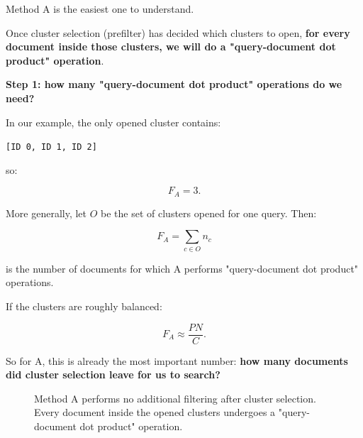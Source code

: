 Method A is the easiest one to understand.

Once cluster selection (prefilter) has decided which clusters to open, \textbf{for every document inside those clusters, we will do a "query-document dot product" operation}.

\textbf{Step 1: how many "query-document dot product" operations do we need?}\par

In our example, the only opened cluster contains:

\texttt{[ID 0, ID 1, ID 2]}

so:

\[
F_A=3.
\]

More generally, let \(O\) be the set of clusters opened for one query. Then:

\[
\boxed{
F_A=\sum_{c\in O}n_c
}
\]

is the number of documents for which A performs "query-document dot product" operations.

If the clusters are roughly balanced:

\[
F_A\approx\frac{PN}{C}.
\]

So for A, this is already the most important number: \textbf{how many documents did cluster selection leave for us to search?}


\begin{figure}[htbp]
\centering
{}
\caption{Method A performs no additional filtering after cluster selection. Every document inside the opened clusters undergoes a "query-document dot product" operation.}
\end{figure}





